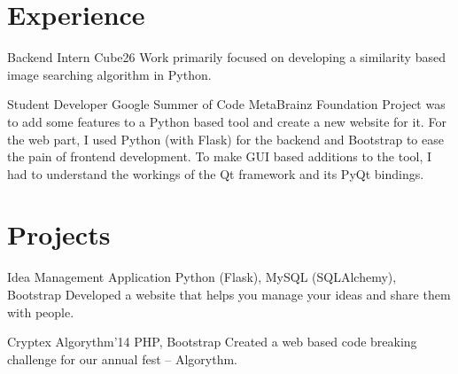 \documentclass[12pt, a4paper, sans]{moderncv}
\title{}
\begin{document}
\maketitle

\section{Experience}

        {Backend Intern}
        {Cube26}
        {}
        {}
        {Work primarily focused on developing a similarity based image searching algorithm in Python.}
        \vspace*{0.2\baselineskip}

        {Student Developer}
        {Google Summer of Code}
        {MetaBrainz Foundation}
        {}
        {Project was to add some features to a Python based tool and create a new website for it. For the web part, I used Python (with Flask) for the backend and Bootstrap to ease the pain of frontend development. To make GUI based additions to the tool, I had to understand the workings of the Qt framework and its PyQt bindings.}
        \vspace*{0.2\baselineskip}

\section{Projects}

        {Idea Management Application}
        {}
        {\scriptsize Python (Flask), MySQL (SQLAlchemy), Bootstrap}
        {}
        {Developed a website that helps you manage your ideas and share them with people.}
        \vspace*{0.2\baselineskip}

        {Cryptex}
        {Algorythm'14}
        {\scriptsize PHP, Bootstrap}
        {}
        {Created a web based code breaking challenge for our annual fest -- Algorythm.}
        \vspace*{0.2\baselineskip}
\end{document}

